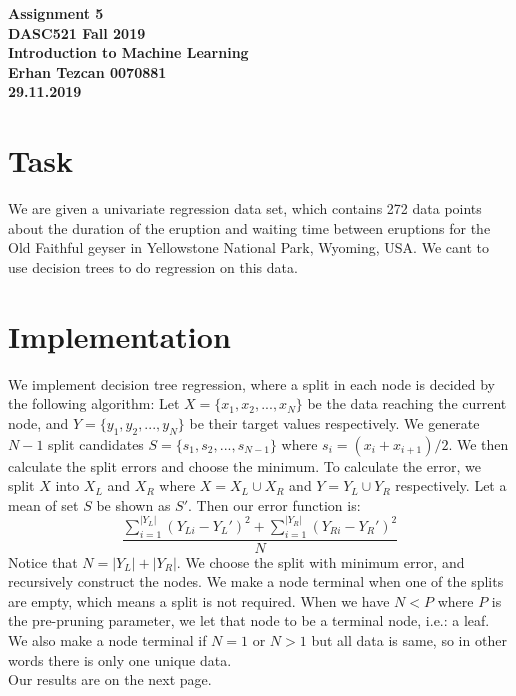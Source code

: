 \documentclass[11pt,reqno]{amsart}
\begin{document}
\begin{center}
\large\textbf{Assignment 5 \\ DASC521 Fall 2019} \\
\normalsize\textbf{Introduction to Machine Learning \\  Erhan Tezcan 0070881 \\ 29.11.2019} \\
\end{center}

\section{Task}
We are given a univariate regression data set, which contains 272 data points about the duration of the eruption and waiting time between eruptions for the Old Faithful geyser in Yellowstone National Park, Wyoming, USA. We cant to use decision trees to do regression on this data.


\section{Implementation}
We implement decision tree regression, where a split in each node is decided by the following algorithm: Let $X = \{x_1, x_2, ..., x_N\}$ be the data reaching the current node, and $Y = \{y_1, y_2, ..., y_N\}$ be their target values respectively. We generate $N-1$ split candidates $S = \{s_1, s_2, ..., s_{N-1}\}$ where $s_i = (x_i+x_{i+1})/2$. We then calculate the split errors and choose the minimum. To calculate the error, we split $X$ into $X_L$ and $X_R$ where $X = X_L \cup X_R$ and $Y = Y_L \cup Y_R$ respectively. Let a mean of set $S$ be shown as $S'$. Then our error function is:
$$
\frac{\sum_{i=1}^{|Y_L|}(Y_{Li} - Y_L')^2+\sum_{i=1}^{|Y_R|}(Y_{Ri} - Y_R')^2}{N}
$$
Notice that $N=|Y_L|+|Y_R|$. We choose the split with minimum error, and recursively construct the nodes. We make a node terminal when one of the splits are empty, which means a split is not required. When we have $N<P$ where $P$ is the pre-pruning parameter, we let that node to be a terminal node, i.e.: a leaf.  We also make a node terminal if $N=1$ or $N>1$ but all data is same, so in other words there is only one unique data. \\

Our results are on the next page. 

\newpage
\end{document}
